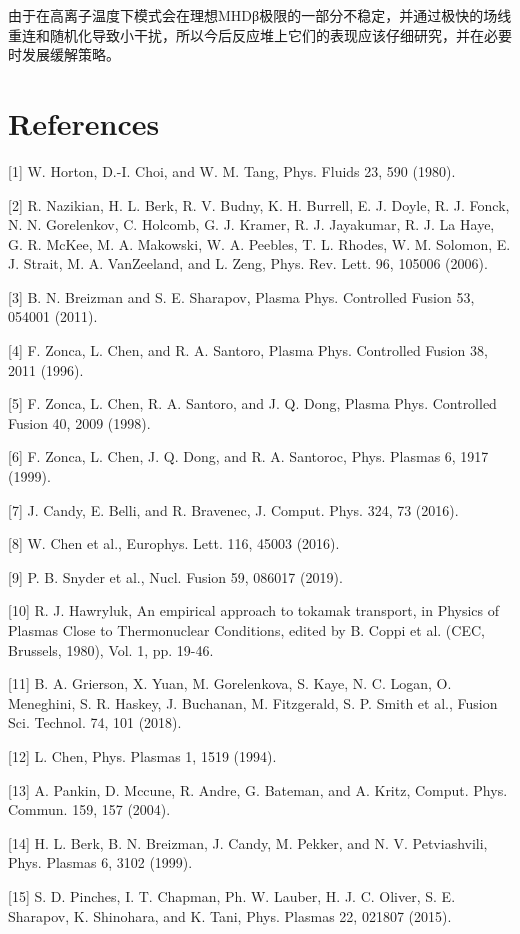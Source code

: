 \documentclass[oneside,onecolumn]{article}
\begin{document}
\begin{sloppypar}
  
 由于在高离子温度下模式会在理想MHDβ极限的一部分不稳定，并通过极快的场线重连和随机化导致小干扰，所以今后反应堆上它们的表现应该仔细研究，并在必要时发展缓解策略。
  
  \clearpage
  \section*{References}
  [1] W. Horton, D.-I. Choi, and W. M. Tang, Phys. Fluids 23, 590 (1980).
  
  [2] R. Nazikian, H. L. Berk, R. V. Budny, K. H. Burrell, E. J. Doyle, R. J. Fonck, N. N. Gorelenkov, C. Holcomb, G. J. Kramer, R. J. Jayakumar, R. J. La Haye, G. R. McKee, M. A. Makowski, W. A. Peebles, T. L. Rhodes, W. M. Solomon, E. J. Strait, M. A. VanZeeland, and L. Zeng, Phys. Rev. Lett. 96, 105006 (2006).
  
  [3] B. N. Breizman and S. E. Sharapov, Plasma Phys. Controlled Fusion 53, 054001 (2011).
  
  [4] F. Zonca, L. Chen, and R. A. Santoro, Plasma Phys. Controlled Fusion 38, 2011 (1996).
  
  [5] F. Zonca, L. Chen, R. A. Santoro, and J. Q. Dong, Plasma Phys. Controlled Fusion 40, 2009 (1998).
  
  [6] F. Zonca, L. Chen, J. Q. Dong, and R. A. Santoroc, Phys. Plasmas 6, 1917 (1999).
  
  [7] J. Candy, E. Belli, and R. Bravenec, J. Comput. Phys. 324, 73 (2016).
  
  [8] W. Chen et al., Europhys. Lett. 116, 45003 (2016).
  
  [9] P. B. Snyder et al., Nucl. Fusion 59, 086017 (2019).
  
  [10] R. J. Hawryluk, An empirical approach to tokamak transport, in Physics of Plasmas Close to Thermonuclear Conditions, edited by B. Coppi et al. (CEC, Brussels, 1980), Vol. 1, pp. 19-46.
  
  [11] B. A. Grierson, X. Yuan, M. Gorelenkova, S. Kaye, N. C. Logan, O. Meneghini, S. R. Haskey, J. Buchanan, M. Fitzgerald, S. P. Smith et al., Fusion Sci. Technol. 74, 101 (2018).
  
  [12] L. Chen, Phys. Plasmas 1, 1519 (1994).
  
  [13] A. Pankin, D. Mccune, R. Andre, G. Bateman, and A. Kritz, Comput. Phys. Commun. 159, 157 (2004).
  
  [14] H. L. Berk, B. N. Breizman, J. Candy, M. Pekker, and N. V. Petviashvili, Phys. Plasmas 6, 3102 (1999).
  
  [15] S. D. Pinches, I. T. Chapman, Ph. W. Lauber, H. J. C. Oliver, S. E. Sharapov, K. Shinohara, and K. Tani, Phys. Plasmas 22, 021807 (2015).
  

\end{sloppypar}
\end{document}
